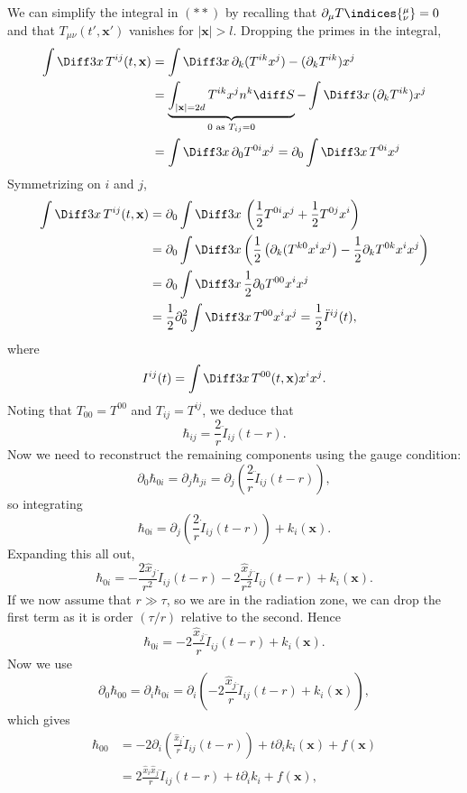 \documentclass[12pt]{article}
\begin{document}
We can simplify the integral in $(\ast\ast)$ by recalling that $\partial_\mu T\indices{^{\mu}_{\nu}} = 0$ and that $T_{\mu\nu}(t', \mathbf{x}')$ vanishes for $|\mathbf{x}| > l$. Dropping the primes in the integral,
\begin{align*}
	\int \Diff 3 x\, T^{ij}(t, \mathbf{x}) &= \int \Diff 3 x\, \partial_k (T^{ik} x^j) - (\partial_k T^{ik}) x^j \\
					       &= \underbrace{\int_{|\mathbf{x}| = 2d} T^{ik} x^j n^k \diff S}_{0 \text{ as } T_{ij} = 0} - \int \Diff 3 x \, (\partial_k T^{ik})x^j \\
					       &= \int \Diff 3 x \, \partial_0 T^{0i} x^j = \partial_0 \int \Diff 3 x \, T^{0i} x^j
\end{align*}
Symmetrizing on $i$ and $j$,
\begin{align*}
	\int \Diff 3 x \, T^{ij} (t,\mathbf{x}) &= \partial_0  \int \Diff 3 x \, \left( \frac 12 T^{0i} x^j + \frac 12 T^{0j} x^i \right) \\
						&= \partial_0 \int \Diff 3 x \left( \frac 12 \left(\partial_k (T^{k0} x^i x^j \right) - \frac 12 \partial_k T^{0k} x^i x^j \right) \\
						&= \partial_0 \int \Diff 3 x \, \frac 12 \partial_0 T^{00} x^i x^j \\
						&= \frac 12 \partial_0^2 \int \Diff 3 x \, T^{00} x^i x^j = \frac 12 \ddot I^{ij}(t),
\end{align*}
where
\[
I^{ij}(t) = \int \Diff 3 x \, T^{00}(t, \mathbf{x}) x^i x^j.
\]
Noting that $T_{00} = T^{00}$ and $T_{ij} = T^{ij}$, we deduce that
\[
\hbar_{ij} = \frac 2r \ddot I_{ij}(t - r).
\]
Now we need to reconstruct the remaining components using the gauge condition:
\[
\partial_0 \hbar_{0i} = \partial_j \hbar_{ji} = \partial_j \left( \frac{2}{r} \ddot I_{ij}(t - r) \right),
\]
so integrating
\[
\hbar_{0i} = \partial_j \left( \frac 2r \dot I_{ij}(t - r) \right) + k_i(\mathbf{x}).
\]
Expanding this all out,
\[
\hbar_{0i} = - \frac{2 \hat x_j}{r^2} \dot I_{ij} (t - r) - 2 \frac{\hat x_j}{r^2} \ddot I_{ij} (t - r) + k_i(\mathbf{x}).
\]
If we now assume that $r \gg \tau$, so we are in the radiation zone, we can drop the first term as it is order $(\tau/r)$ relative to the second. Hence
\[
\hbar_{0i} = - 2 \frac{\hat x_j}{r} \ddot I_{ij}(t - r) + k_i(\mathbf{x}).
\]
Now we use
\[
\partial_0 \hbar_{00} = \partial_i \hbar_{0i} = \partial_i \left( - 2 \frac{\hat x_j}{r} \ddot I_{ij}(t - r) + k_i(\mathbf{x}) \right),
\]
which gives
\begin{align*}
	\hbar_{00} &= - 2 \partial_i \left( \frac{\hat x_j}{r} \dot I_{ij} (t - r) \right) + t \partial_i k_i(\mathbf{x}) + f(\mathbf{x}) \\
		   &= 2 \frac{\hat x_i \hat x_j}{r} \ddot I_{ij}(t - r) + t \partial_i k_i + f(\mathbf{x}),
\end{align*}
\end{document}
